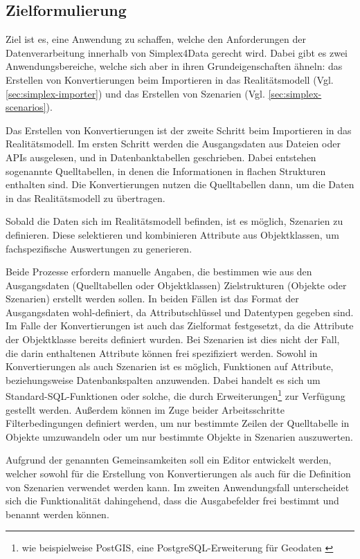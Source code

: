 \subsection{Zielformulierung}

Ziel ist es, eine Anwendung zu schaffen, welche den Anforderungen der Datenverarbeitung innerhalb von Simplex4Data gerecht wird. Dabei gibt es zwei Anwendungsbereiche, welche sich aber in ihren Grundeigenschaften ähneln: das Erstellen von Konvertierungen beim Importieren in das Realitätsmodell (Vgl. \ref{sec:simplex-importer}) und das Erstellen von Szenarien (Vgl. \ref{sec:simplex-scenarios}).

Das Erstellen von Konvertierungen ist der zweite Schritt beim Importieren in das Realitätsmodell. Im ersten Schritt werden die Ausgangsdaten aus Dateien oder APIs ausgelesen, und in Datenbanktabellen geschrieben. Dabei entstehen sogenannte Quelltabellen, in denen die Informationen in flachen Strukturen enthalten sind. Die Konvertierungen nutzen die Quelltabellen dann, um die Daten in das Realitätsmodell zu übertragen.

Sobald die Daten sich im Realitätsmodell befinden, ist es möglich, Szenarien zu definieren. Diese selektieren und kombinieren Attribute aus Objektklassen, um fachspezifische Auswertungen zu generieren.

Beide Prozesse erfordern manuelle Angaben, die bestimmen wie aus den Ausgangsdaten (Quelltabellen oder Objektklassen) Zielstrukturen (Objekte oder Szenarien) erstellt werden sollen. In beiden Fällen ist das Format der Ausgangsdaten wohl-definiert, da Attributschlüssel und Datentypen gegeben sind. Im Falle der Konvertierungen ist auch das Zielformat festgesetzt, da die Attribute der Objektklasse bereits definiert wurden. Bei Szenarien ist dies nicht der Fall, die darin enthaltenen Attribute können frei spezifiziert werden. Sowohl in Konvertierungen als auch Szenarien ist es möglich, Funktionen auf Attribute, beziehungsweise Datenbankspalten anzuwenden. Dabei handelt es sich um Standard-\ac{SQL}-Funktionen oder solche, die durch Erweiterungen\footnote{wie beispielweise PostGIS, eine PostgreSQL-Erweiterung für Geodaten \parencite{postgispscPostGIS}} zur Verfügung gestellt werden. Außerdem können im Zuge beider Arbeitsschritte Filterbedingungen definiert werden, um nur bestimmte Zeilen der Quelltabelle in Objekte umzuwandeln oder um nur bestimmte Objekte in Szenarien auszuwerten.

Aufgrund der genannten Gemeinsamkeiten soll ein Editor entwickelt werden, welcher sowohl für die Erstellung von Konvertierungen als auch für die Definition von Szenarien verwendet werden kann. Im zweiten Anwendungsfall unterscheidet sich die Funktionalität dahingehend, dass die Ausgabefelder frei bestimmt und benannt werden können.

